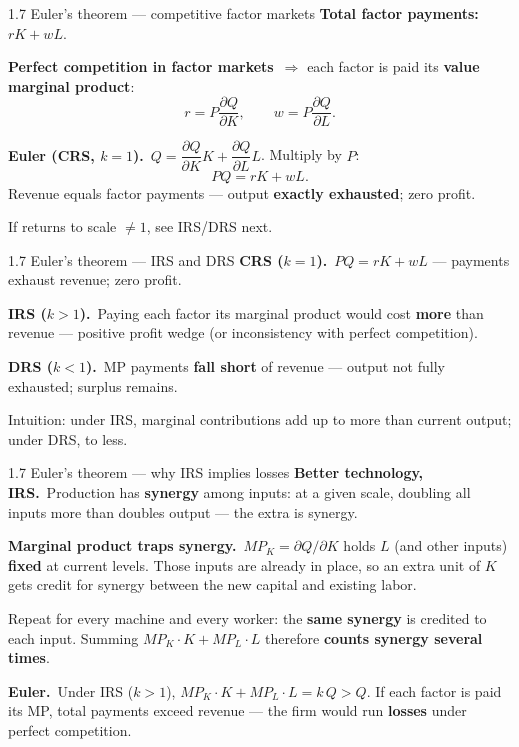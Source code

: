 \documentclass[11pt,aspectratio=169]{beamer}
\begin{document}
\begin{frame}{1.7 Euler's theorem --- competitive factor markets}
  \footnotesize
  \textbf{Total factor payments:}\ $rK+wL$.

  \medskip
  \textbf{Perfect competition in factor markets}\ $\Rightarrow$ each factor is
  paid its \textbf{value marginal product}:
  \[
    r=P\frac{\partial Q}{\partial K},\qquad
    w=P\frac{\partial Q}{\partial L}.
  \]

  \medskip
  \textbf{Euler (CRS, $k=1$).}\ $Q=\dfrac{\partial Q}{\partial K}K+\dfrac{\partial Q}{\partial L}L$.
  Multiply by $P$:
  \[
    PQ=rK+wL.
  \]
  Revenue equals factor payments --- output \textbf{exactly exhausted}; zero profit.

  \medskip
  {\scriptsize If returns to scale $\neq 1$, see IRS/DRS next.}
\end{frame}

\begin{frame}{1.7 Euler's theorem --- IRS and DRS}
  \footnotesize
  \textbf{CRS ($k=1$).}\ $PQ=rK+wL$ --- payments exhaust revenue; zero profit.

  \medskip
  \textbf{IRS ($k>1$).}\ Paying each factor its marginal product would cost
  \textbf{more} than revenue --- positive profit wedge (or inconsistency with
  perfect competition).

  \medskip
  \textbf{DRS ($k<1$).}\ MP payments \textbf{fall short} of revenue --- output
  not fully exhausted; surplus remains.

  \medskip
  {\scriptsize Intuition: under IRS, marginal contributions add up to more than
  current output; under DRS, to less.}
\end{frame}

\begin{frame}{1.7 Euler's theorem --- why IRS implies losses}
  \footnotesize
  \textbf{Better technology, IRS.}\ Production has \textbf{synergy} among inputs:
  at a given scale, doubling all inputs more than doubles output --- the extra
  is synergy.

  \medskip
  \textbf{Marginal product traps synergy.}\ $MP_K=\partial Q/\partial K$ holds
  $L$ (and other inputs) \textbf{fixed} at current levels.
  Those inputs are already in place, so an extra unit of $K$ gets credit for
  synergy between the new capital and existing labor.

  \medskip
  Repeat for every machine and every worker: the \textbf{same synergy} is
  credited to each input.
  Summing $MP_K\cdot K+MP_L\cdot L$ therefore \textbf{counts synergy several
  times}.

  \medskip
  \textbf{Euler.}\ Under IRS ($k>1$), $MP_K\cdot K+MP_L\cdot L=k\,Q>Q$.
  If each factor is paid its MP, total payments exceed revenue --- the firm
  would run \textbf{losses} under perfect competition.
\end{frame}
\end{document}
